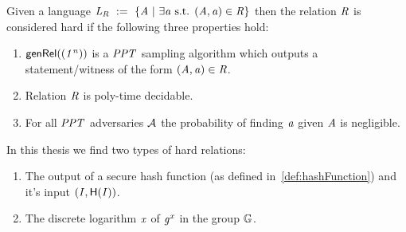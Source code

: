 \begin{definition}\label{def:hardRelation}
    Given a language $\mathit{L}_{\mathit{R}} ~:=~ \{\mathit{A} ~|~ \exists\mathit{a} \text{ s.t. } (\mathit{A}, \mathit{a}) \in \mathit{R}\}$ then the relation $\mathit{R}$ is
    considered hard if the following three properties hold:
    \begin{enumerate}
        \item $\mathsf{genRel}((\mathit{1^n}))$ is a $\mathit{PPT}$ sampling algorithm which outputs a statement/witness of the form $(\mathit{A}, \mathit{a}) \in \mathit{R}$.
        \item Relation $\mathit{R}$ is poly-time decidable.
        \item For all $\mathit{PPT}$ adversaries $\mathcal{A}$ the probability of finding $\mathit{a}$ given $\mathit{A}$ is negligible.
    \end{enumerate}
    
    
    In this thesis we find two types of hard relations:
    \begin{enumerate}
        \item The output of a secure hash function (as defined in~\ref{def:hashFunction}) and it's input $(\mathit{I}, \mathsf{H} (\mathit{I}))$.
        \item The discrete logarithm $\mathit{x}$ of $\mathit{g}^{\mathit{x}}$ in the group $\mathbb{G}$.
    \end{enumerate}
\end{definition}


